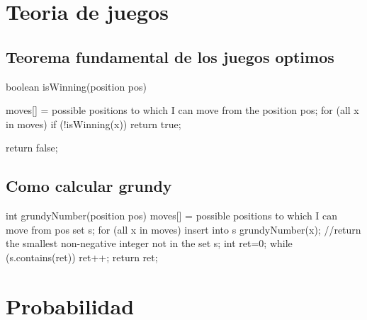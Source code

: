 

\section{Teoria de juegos}
\subsection{Teorema fundamental de los juegos optimos}
\begin{code}
boolean isWinning(position pos) {
    moves[] = possible positions to which I can move from the position pos;
    for (all x in moves) 
        if (!isWinning(x)) return true;
    
    return false; 
}
\end{code}
\subsection{Como calcular grundy}
\begin{code}
int grundyNumber(position pos) {
    moves[] = possible positions to which I can move from pos
    set s;
    for (all x in moves) insert into s grundyNumber(x);
    //return the smallest non-negative integer not in the set s;    
    int ret=0;
    while (s.contains(ret)) ret++;
    return ret;
}
\end{code}
\section{Probabilidad}
